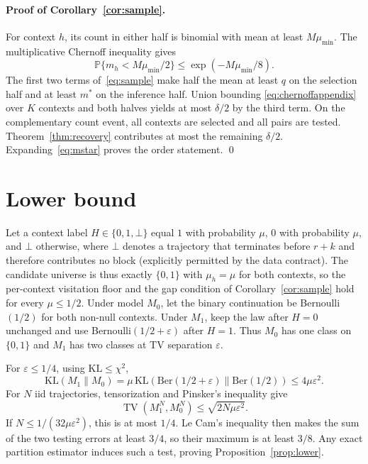 \documentclass{article}
\newcommand{\Prb}{\mathbb P}
\newcommand{\eps}{\varepsilon}
\DeclareMathOperator{\TV}{TV}
\begin{document}
\paragraph{Proof of Corollary~\ref{cor:sample}.}
For context $h$, its count in either half is binomial with mean at least
$M\mu_{\min}$.  The multiplicative Chernoff inequality gives
\begin{equation}
 \Prb\{m_h<M\mu_{\min}/2\}
 \le \exp(-M\mu_{\min}/8).                             \label{eq:chernoffappendix}
\end{equation}
The first two terms of~\eqref{eq:sample} make half the mean at least $q$ on
the selection half and at least $m^*$ on the inference half.  Union bounding
\eqref{eq:chernoffappendix} over $K$ contexts and both halves yields at most $\delta/2$ by the third
term.  On the complementary count event, all contexts are selected and all
pairs are tested.  Theorem~\ref{thm:recovery} contributes at most the remaining
$\delta/2$.  Expanding~\eqref{eq:mstar} proves the order statement. \qed

\section{Lower bound}                                  \label{app:lower}

Let a context label $H\in\{0,1,\bot\}$ equal $1$ with probability $\mu$,
$0$ with probability $\mu$, and $\bot$ otherwise, where $\bot$ denotes a
trajectory that terminates before $r+k$ and therefore contributes no block
(explicitly permitted by the data contract).  The candidate universe is thus
exactly $\{0,1\}$ with $\mu_h=\mu$ for both contexts, so the per-context
visitation floor and the gap condition of Corollary~\ref{cor:sample} hold
for every $\mu\le1/2$.  Under model $M_0$, let the
binary continuation be Bernoulli$(1/2)$ for both non-null contexts.  Under
$M_1$, keep the law after $H=0$ unchanged and use
Bernoulli$(1/2+\eps)$ after $H=1$.  Thus $M_0$ has one class on $\{0,1\}$ and
$M_1$ has two classes at TV separation $\eps$.

For $\eps\le1/4$, using $\mathrm{KL}\le\chi^2$,
\begin{equation}
 \mathrm{KL}(M_1\|M_0)
 =\mu\,\mathrm{KL}(\mathrm{Ber}(1/2+\eps)\|\mathrm{Ber}(1/2))
 \le 4\mu\eps^2.                                      \label{eq:klappendix}
\end{equation}
For $N$ iid trajectories, tensorization and Pinsker's inequality give
\begin{equation}
 \TV(M_1^N,M_0^N)\le\sqrt{2N\mu\eps^2}.
\end{equation}
If $N\le1/(32\mu\eps^2)$, this is at most $1/4$.
Le Cam's inequality then makes the sum of the two testing errors at least
$3/4$, so their maximum is at least $3/8$.  Any exact
partition estimator induces such a test, proving Proposition~\ref{prop:lower}.
\end{document}
